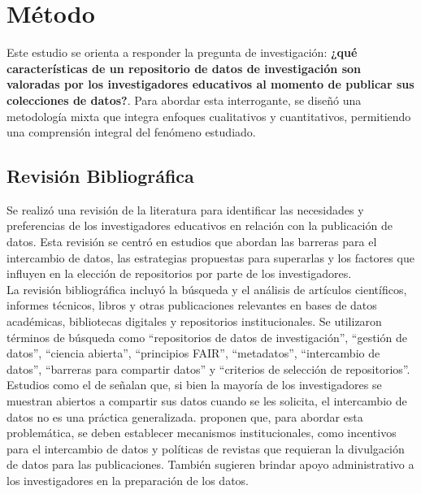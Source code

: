 \documentclass[runningheads]{llncs}
\begin{document}
\section{Método}

Este estudio se orienta a responder la pregunta de investigación: \textbf{¿qué características de un repositorio de datos de investigación son valoradas por los investigadores educativos al momento de publicar sus colecciones de datos?}. Para abordar esta interrogante, se diseñó una metodología mixta que integra enfoques cualitativos y cuantitativos, permitiendo una comprensión integral del fenómeno estudiado.\\

\subsection{Revisión Bibliográfica}
Se realizó una revisión de la literatura para identificar las necesidades y preferencias de los investigadores educativos en relación con la publicación de datos. Esta revisión se centró en estudios que abordan las barreras para el intercambio de datos, las estrategias propuestas para superarlas y los factores que influyen en la elección de repositorios por parte de los investigadores.\\
La revisión bibliográfica incluyó la búsqueda y el análisis de artículos científicos, informes técnicos, libros y otras publicaciones relevantes en bases de datos académicas, bibliotecas digitales y repositorios institucionales. Se utilizaron términos de búsqueda como ``repositorios de datos de investigación'', ``gestión de datos'', ``ciencia abierta'', ``principios FAIR'', ``metadatos'', ``intercambio de datos'', ``barreras para compartir datos'' y ``criterios de selección de repositorios''.\\

Estudios como el de \cite{barczak2022} señalan que, si bien la mayoría de los investigadores se muestran abiertos a compartir sus datos cuando se les solicita, el intercambio de datos no es una práctica generalizada. \cite{barczak2022} proponen que, para abordar esta problemática, se deben establecer mecanismos institucionales, como incentivos para el intercambio de datos y políticas de revistas que requieran la divulgación de datos para las publicaciones. También sugieren brindar apoyo administrativo a los investigadores en la preparación de los datos.\\
\end{document}
